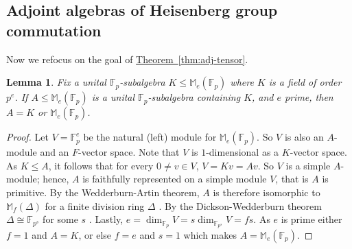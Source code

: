 \documentclass[11pt]{article}
\numberwithin{equation}{section}
\theoremstyle{definition}
\theoremstyle{plain}
\newcommand{\expref}[2]{\hyperref[#2]{#1~\ref{#2}}}
\numberwithin{equation}{section}
\theoremstyle{plain}       %
\newtheorem{lem}[equation]{Lemma}
\theoremstyle{remark}
\theoremstyle{definition}
\numberwithin{figure}{section}
\numberwithin{table}{section}
\newcommand{\bbF}{\mathbb{F}}  %
\begin{document}
\subsection{Adjoint algebras of Heisenberg group commutation}

Now we refocus on the goal of \expref{Theorem}{thm:adj-tensor}. 
\begin{lem}\label{lem:Jac}
	Fix a unital $\bbF_p$-subalgebra $K\leq \mathbb{M}_e(\bbF_p)$ where $K$ is a
	field of order $p^e$.  If $A\leq \mathbb{M}_{e}(\bbF_p)$ is a unital
	$\bbF_p$-subalgebra containing $K$, and $e$ prime, then $A=K$ or
	$\mathbb{M}_e(\bbF_p)$.
\end{lem}
\begin{proof}
  Let $V=\bbF_p^e$ be the natural (left) module for $\mathbb{M}_e(\bbF_p)$. So
$V$ is also an $A$-module and an $F$-vector space.  Note that $V$ is
$1$-dimensional as a $K$-vector space.  As $K\leq A$, it follows that for every
$0\neq v\in V$, $V=Kv=Av$.  So $V$ is a simple $A$-module; hence, $A$ is
faithfully represented on a simple module $V$, that is $A$ is primitive.  By the
Wedderburn-Artin theorem, $A$ is therefore isomorphic to $\mathbb{M}_f(\Delta)$
for a finite division ring $\Delta$ \cite[p. 421]{Hungerford}. By the
Dickson-Wedderburn theorem $\Delta\cong \bbF_{p^s}$ for some $s$ \cite[p.
462]{Hungerford}. Lastly, $e=\dim_{\bbF_p} V=s\dim_{\bbF_{p^s}} V=fs$.  As $e$
is prime either $f=1$ and $A=K$, or else $f=e$ and $s=1$ which makes
$A=\mathbb{M}_e(\bbF_p)$.  
\end{proof}
\end{document}
